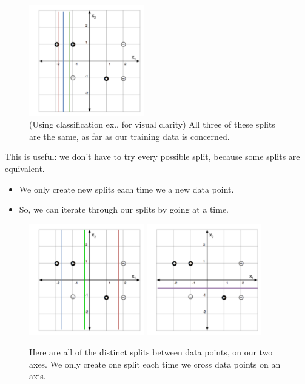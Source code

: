         \begin{figure}[H]
            \centering
            \includegraphics[width=50mm,scale=0.5]{images/nonparametric_images/equivalent_splits.png}
            \caption*{ (Using classification ex., for visual clarity) All three of these splits are the same, as far as our training data is concerned.}
        \end{figure}

        This is useful: we don't have to try every possible split, because some splits are equivalent.

        \begin{itemize}
            \item We only create new splits each time we  a new data point.
            \item So, we can iterate through our splits by going  at a time.
        \end{itemize}

        \begin{figure}[H]
            \centering
            \includegraphics[width=50mm,scale=0.5]{images/nonparametric_images/unique_splits_x1.png}
            \includegraphics[width=50mm,scale=0.5]{images/nonparametric_images/unique_splits_x2.png}
            \caption*{Here are all of the distinct splits between data points, on our two axes. We only create one split each time we cross data points on an axis.}
        \end{figure}


